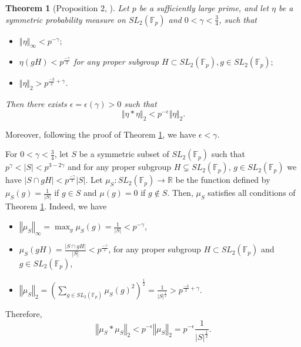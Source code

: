 \documentclass[11pt]{article}
\newtheorem{theorem}{Theorem}[section]
\def\Fbb{\mathbb{F}}
\def\Rbb{\mathbb{R}}
\def\SL{SL}
\def\l({\left(}
\def\r){\right)}
\def\lv{\left\vert}
\def\rv{\right\vert}
\def\lV{\left\Vert}
\def\rV{\right\Vert}
\def\rar{\rightarrow}
\begin{document}
\begin{theorem}[Proposition $2$, \cite{B.A.08}]\label{thm: 7.1}
Let $p$ be a sufficiently large prime, and let $\eta$ be a symmetric probability measure on $\SL_2(\Fbb_p)$ and $0< \gamma < \frac{3}{4}$, such that
\begin{itemize}
\item[(1)] $\lV \eta  \rV_{\infty} < p^{-\gamma} ;$
\item[(2)] $\eta(gH)<p^{\frac{-\gamma }{2}} $ for any proper subgroup $H\subset SL_2( \Fbb_p ), g\in SL_2( \Fbb_p );$
\item[(3)] $\Vert \eta\Vert_2> p^{\frac{-3}{2} +\gamma}$.
\end{itemize}
Then there exists $\epsilon = \epsilon \l( \gamma \r) >0$ such that
$$
\Vert\eta*\eta\Vert_2 < p^{-\epsilon} \Vert\eta\Vert_2.
$$
\end{theorem}

Moreover, following the proof of Theorem \ref{thm: 7.1}, we have $\epsilon < \gamma$. 

For $0< \gamma <\frac{3}{4}$, let $S$ be a symmetric subset of $\SL_2 \l( \Fbb_p \r)$ such that $p^{\gamma}<|S|<p^{3-2\gamma}$ and for any proper subgroup $H \subsetneq \SL_2 \l( \Fbb_p \r) $, $g \in \SL_2 \l( \Fbb_p \r)$ we have $\lv S\cap gH\rv < p^{\frac{-\gamma }{2}}\lv S\rv $. Let $\mu_S : \SL_2 \l( \Fbb_p \r) \rar \Rbb $ be the function defined by $\mu_S \l( g \r) =\frac{1}{\lv S\rv}$ if $g\in S$ and $\mu (g)=0$ if $g \notin S$. Then, $\mu_S$ satisfies all conditions of Theorem \ref{thm: 7.1}. Indeed, we have 
\begin{itemize}
    \item[(1)] $\lV \mu_S \rV_\infty = \max_{g} \mu_S(g) = \frac{1}{|S|} < p^{-\gamma }$,
    \item[(2)] $\mu_S (gH) = \frac{|S\cap gH|}{|S|} < p^{\frac{-\gamma }{2}}$, for any proper subgroup $H \subset \SL_2(\Fbb_p)$ and $g\in \SL_2(\Fbb_p)$,
    \item[(3)] $\lV \mu_S \rV_2 = \l( \sum_{g\in \SL_2(\Fbb_p)} \mu_S(g)^2 \r)^{\frac{1}{2}} = \frac{1}{|S|^{\frac{1}{2}}} > p^{\frac{-3}{2}+\gamma}.$
\end{itemize}
Therefore,
\[ \lV \mu_S \ast \mu_S \rV_2 < p^{-\epsilon} \lV \mu_S \rV_2 = p^{-\epsilon} \frac{1}{\lv S\rv^{\frac{1}{2}}}. \]
\end{document}
